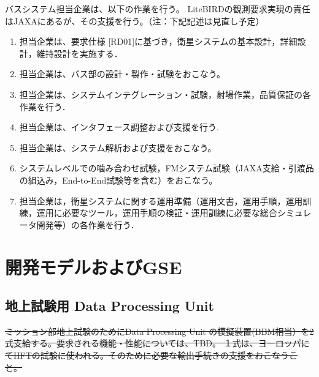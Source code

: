 \documentclass[xelatex,ja=standard]{bxjsarticle}
\begin{document}
バスシステム担当企業は、以下の作業を行う。
LiteBIRDの観測要求実現の責任はJAXAにあるが、その支援を行う。（注：下記記述は見直し予定）

\begin{enumerate}
\item 担当企業は、要求仕様 [RD01]に基づき，衛星システムの基本設計，詳細設計，維持設計を実施する．
\item 担当企業は、バス部の設計・製作・試験をおこなう。
\item 担当企業は、システムインテグレーション・試験，射場作業，品質保証の各作業を行う．
\item 担当企業は、インタフェース調整および支援を行う.
\item 担当企業は、システム解析および支援をおこなう。
\item システムレベルでの噛み合わせ試験，FMシステム試験（JAXA支給・引渡品の組込み，End-to-End試験等を含む）をおこなう。
\item 担当企業は，衛星システムに関する運用準備（運用文書，運用手順，運用訓練，運用に必要なツール，運用手順の検証・運用訓練に必要な総合シミュレータ開発等）の各作業を行う．
\end{enumerate}

\section{開発モデルおよびGSE}


\subsection{地上試験用 Data Processing Unit}
\sout{ミッション部地上試験のためにData Processing Unit の模擬装置(BBM相当）を2式支給する。要求される機能・性能については、TBD。
１式は、ヨーロッパにてHFTの試験に使われる。そのために必要な輸出手続きの支援をおこなうこと。}
\end{document}

